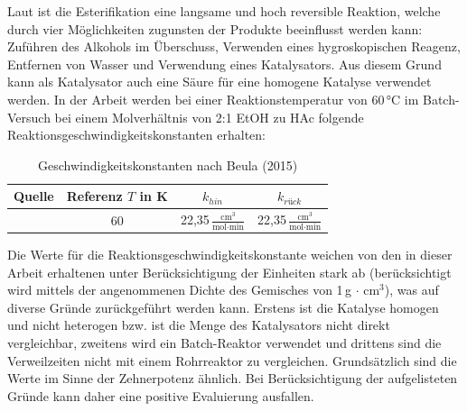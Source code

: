 \documentclass[12pt,liststotoc]{report}
\begin{document}
Laut \cite{beula2015kinetics} ist die Esterifikation eine langsame und hoch reversible Reaktion, welche durch vier Möglichkeiten zugunsten der Produkte beeinflusst werden kann: Zuführen des Alkohols im Überschuss, Verwenden eines hygroskopischen Reagenz, Entfernen von Wasser und Verwendung eines Katalysators. Aus diesem Grund kann als Katalysator auch eine Säure für eine homogene Katalyse verwendet werden. In der Arbeit werden bei einer Reaktionstemperatur von 60\,°C im Batch-Versuch bei einem Molverhältnis von 2:1 EtOH zu HAc folgende Reaktionsgeschwindigkeitskonstanten erhalten:


\begin{table}[H]
	\caption{Geschwindigkeitskonstanten nach Beula (2015)}
	\centering
	\begin{tabular}{cccc}
		\toprule 
		Quelle & Referenz $T$ in K & $k_{hin}$ & $k_{rück}$  \\
		\midrule
		\cite{beula2015kinetics} & 60 & 22,35\,$\frac{\text{cm}^3}{\text{mol}\cdot \text{min}}$ & 22,35\,$\frac{\text{cm}^3}{\text{mol}\cdot \text{min}}$ \\
		\bottomrule
	\end{tabular}
	\label{tab:KinetikVergleich1}
\end{table}
\noindent
Die Werte für die Reaktionsgeschwindigkeitskonstante weichen von den in dieser Arbeit erhaltenen unter Berücksichtigung der Einheiten stark ab (berücksichtigt wird mittels der angenommenen Dichte des Gemisches von 1\,g $\cdot$ cm$^3$), was auf diverse Gründe zurückgeführt werden kann. Erstens ist die Katalyse homogen und nicht heterogen bzw. ist die Menge des Katalysators nicht direkt vergleichbar, zweitens wird ein Batch-Reaktor verwendet und drittens sind die Verweilzeiten nicht mit einem Rohrreaktor zu vergleichen. Grundsätzlich sind die Werte im Sinne der Zehnerpotenz ähnlich. Bei Berücksichtigung der aufgelisteten Gründe kann daher eine positive Evaluierung ausfallen.
\end{document}
